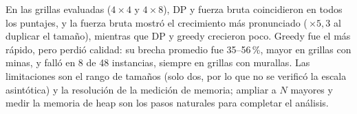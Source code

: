 En las grillas evaluadas ($4\times4$ y $4\times8$), DP y fuerza bruta
coincidieron en todos los puntajes, y la fuerza bruta mostr\'o el crecimiento
m\'as pronunciado (\,$\times5{,}3$ al duplicar el tama\~no), mientras que DP y
greedy crecieron poco. Greedy fue el m\'as r\'apido, pero perdi\'o calidad: su
brecha promedio fue 35--56\,\%, mayor en grillas con minas, y fall\'o en 8 de 48
instancias, siempre en grillas con murallas. Las limitaciones son el rango de
tama\~nos (solo dos, por lo que no se verific\'o la escala asint\'otica) y la
resoluci\'on de la medici\'on de memoria; ampliar a $N$ mayores y medir la
memoria de heap son los pasos naturales para completar el an\'alisis.
 